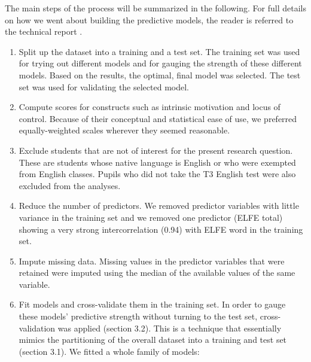 \documentclass[output=paper]{langsci/langscibook}
\begin{document}
The main steps of the process will be summarized in the following. For full details on how we went about building the predictive models, the reader is referred to the technical report \citep{Vanhove2021}. 

\begin{enumerate}
\item Split up the dataset into a training and a test set. The training set was used for trying out different models and for gauging the strength of these different models. Based on the results, the optimal, final model was selected. The test set was used for validating the selected model.
\item Compute scores for constructs such as intrinsic motivation and locus of control. Because of their conceptual and statistical ease of use, we preferred equally-weighted scales wherever they seemed reasonable.
\item Exclude students that are not of interest for the present research question. These are students whose native language is English or who were exempted from English classes. Pupils who did not take the T3 English test were also excluded from the analyses.
\item Reduce the number of predictors. We removed predictor variables with little variance in the training set and we removed one predictor (ELFE total) showing a very strong intercorrelation (0.94) with ELFE word in the training set.
\item Impute missing data. Missing values in the predictor variables that were retained were imputed using the median of the available values of the same variable.
\item Fit models and cross-validate them in the training set. In order to gauge these models’ predictive strength without turning to the test set, cross-validation was applied (section 3.2). This is a technique that essentially mimics the partitioning of the overall dataset into a training and test set (section 3.1). We fitted a whole family of models:


\end{enumerate}
\end{document}

